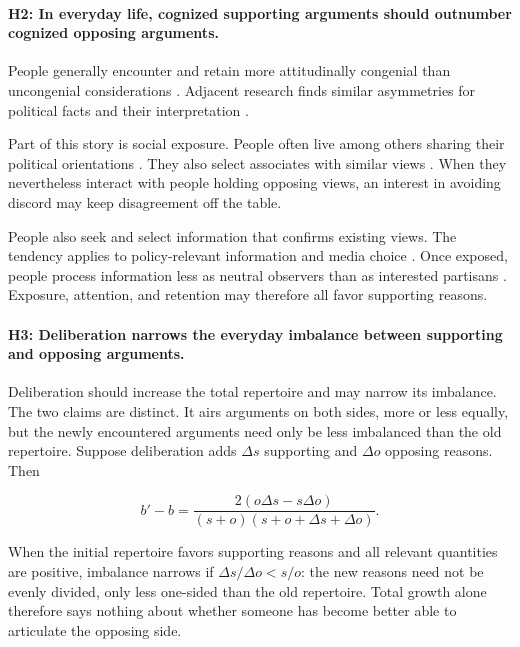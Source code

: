 \documentclass[11pt]{article}
\begin{document}
\paragraph{H2: In everyday life, cognized supporting arguments should outnumber cognized
opposing arguments.}
People generally encounter and retain more attitudinally congenial than uncongenial
considerations \citep{mutz2002cross,baron1998judgment}. Adjacent research finds similar
asymmetries for political facts and their interpretation
\citep{dellicarpini1991stability,dellicarpini1997what,bartels2002beyond,
shapiro2008facts,jerit2012partisan,
gaines2007same}.

Part of this story is social exposure. People often live among others sharing their political
orientations \citep{bishop2009big,abrams2012big,cho2013voter,mcdonald2011migration}. They also select associates with similar
views \citep{verbrugge1977structure,verbrugge1983research,huckfeldt1995citizens,
mutz2001facilitating,mackuen1990speaking,bennett2000political}. When they nevertheless interact with people holding
opposing views, an interest in avoiding discord may keep disagreement off the table.

People also seek and select information that confirms existing views. The tendency applies to
policy-relevant information and media choice \citep{iyengar2008selective,
garrett2009politically,iyengar2009red,
stroud2008media,sunstein2001republic}. Once exposed, people process information less as neutral
observers than as interested partisans \citep{chang2003party,lord1979biased}. Exposure,
attention, and retention may therefore all favor supporting reasons.

\paragraph{H3: Deliberation narrows the everyday imbalance between supporting and opposing
arguments.}
Deliberation should increase the total repertoire and may narrow its imbalance. The two claims
are distinct. It airs arguments on both sides, more or less equally, but the newly encountered
arguments need only be less imbalanced than the old repertoire. Suppose deliberation adds
$\Delta s$ supporting and $\Delta o$ opposing reasons. Then

\begin{equation}
b'-b=
\frac{2(o\Delta s-s\Delta o)}
{(s+o)(s+o+\Delta s+\Delta o)}.
\end{equation}

When the initial repertoire favors supporting reasons and all relevant quantities are positive,
imbalance narrows if $\Delta s/\Delta o<s/o$: the new reasons need not be evenly divided, only
less one-sided than the old repertoire. Total growth alone therefore says nothing about whether
someone has become better able to articulate the opposing side.
\end{document}
